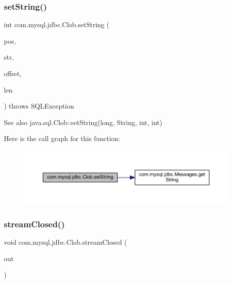 \subsubsection{\texorpdfstring{set\+String()}{setString()}\hspace{0.1cm}{\footnotesize\ttfamily [2/2]}}
{\footnotesize\ttfamily int com.\+mysql.\+jdbc.\+Clob.\+set\+String (\begin{DoxyParamCaption}\item[{long}]{pos,  }\item[{String}]{str,  }\item[{int}]{offset,  }\item[{int}]{len }\end{DoxyParamCaption}) throws S\+Q\+L\+Exception}

\begin{DoxySeeAlso}{See also}
java.\+sql.\+Clob\+::set\+String(long, String, int, int) 
\end{DoxySeeAlso}
Here is the call graph for this function\+:\nopagebreak
\begin{figure}[H]
\begin{center}
\leavevmode
\includegraphics[width=350pt]{classcom_1_1mysql_1_1jdbc_1_1_clob_a6cee59292b60d8e788a9218940284154_cgraph}
\end{center}
\end{figure}
\mbox{\label{classcom_1_1mysql_1_1jdbc_1_1_clob_a70ec18cf9f17467e40d95a64db72866e}} 
\subsubsection{\texorpdfstring{stream\+Closed()}{streamClosed()}}
{\footnotesize\ttfamily void com.\+mysql.\+jdbc.\+Clob.\+stream\+Closed (\begin{DoxyParamCaption}\item[{Watchable\+Output\+Stream}]{out }\end{DoxyParamCaption})}

